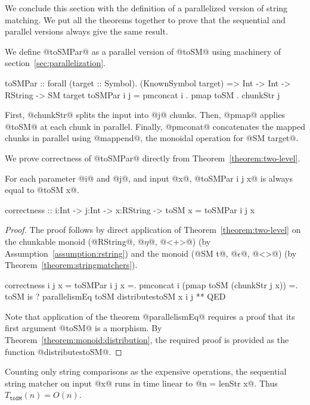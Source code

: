 We conclude this section with
the definition of a parallelized version of string matching.
%
We put all the theorems together to prove 
that the sequential and parallel versions always give the same result.

We define @toSMPar@ as a parallel version of @toSM@ using machinery of section~\ref{sec:parallelization}.
\begin{code}
  toSMPar :: forall (target :: Symbol). (KnownSymbol target)
          => Int -> Int -> RString -> SM target
  toSMPar i j = pmconcat i . pmap toSM . chunkStr j
\end{code}
%
First, @chunkStr@ splits the input into @j@ chunks.
%
Then, @pmap@ applies @toSM@ at each chunk in parallel.
Finally, @pmconat@ concatenates the mapped chunks in parallel
using @mappend@, the monoidal operation for @SM target@.

We prove correctness of @toSMPar@ directly from
Theorem~\ref{theorem:two-level}.
\begin{theorem}\label{theorem:correctness}
For each parameter @i@ and @j@, and input @x@,
@toSMPar i j x@ is always equal to @toSM x@.
\begin{code}
  correctness :: i:Int -> j:Int -> x:RString
              -> {toSM x = toSMPar i j x}
\end{code}
\end{theorem}

\begin{proof}
The proof follows by direct application of Theorem~\ref{theorem:two-level}
on the chunkable monoid (@RString@, @$\eta$@, @<+>@) (by Assumption~\ref{assumption:rstring})
and the monoid (@SM t@, @$\epsilon$@, @<>@) (by Theorem~\ref{theorem:stringmatchers}).
%
\begin{code}
  correctness i j x
    =   toSMPar i j x
    =. pmconcat i (pmap toSM (chunkStr j x))
    =. toSM is
       ? parallelismEq toSM distributestoSM x i j
    ** QED
\end{code}
%
Note that application of the theorem @parallelismEq@
requires a proof that its first argument @toSM@ is a morphism.
%
By Theorem~\ref{theorem:monoid:distribution},
the required proof is provided as the function @distributestoSM@.
\cqed\end{proof}


Counting only string comparisons as the expensive operations,
the sequential string matcher on input @x@ runs in time
linear to @n = lenStr x@. Thus $T_\texttt{toSM}(n) = O(n)$.

